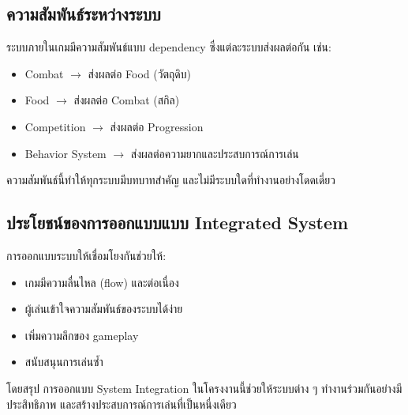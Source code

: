 \subsection{ความสัมพันธ์ระหว่างระบบ}

ระบบภายในเกมมีความสัมพันธ์แบบ dependency ซึ่งแต่ละระบบส่งผลต่อกัน เช่น:
\begin{itemize}
    \item Combat $\rightarrow$ ส่งผลต่อ Food (วัตถุดิบ)
    \item Food $\rightarrow$ ส่งผลต่อ Combat (สกิล)
    \item Competition $\rightarrow$ ส่งผลต่อ Progression
    \item Behavior System $\rightarrow$ ส่งผลต่อความยากและประสบการณ์การเล่น
\end{itemize}

ความสัมพันธ์นี้ทำให้ทุกระบบมีบทบาทสำคัญ และไม่มีระบบใดที่ทำงานอย่างโดดเดี่ยว

\subsection{ประโยชน์ของการออกแบบแบบ Integrated System}

การออกแบบระบบให้เชื่อมโยงกันช่วยให้:
\begin{itemize}
    \item เกมมีความลื่นไหล (flow) และต่อเนื่อง
    \item ผู้เล่นเข้าใจความสัมพันธ์ของระบบได้ง่าย
    \item เพิ่มความลึกของ gameplay
    \item สนับสนุนการเล่นซ้ำ
\end{itemize}


โดยสรุป การออกแบบ System Integration ในโครงงานนี้ช่วยให้ระบบต่าง ๆ ทำงานร่วมกันอย่างมีประสิทธิภาพ และสร้างประสบการณ์การเล่นที่เป็นหนึ่งเดียว